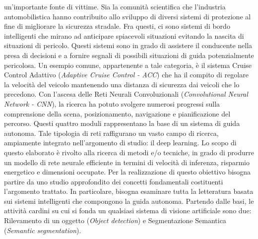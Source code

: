 un'importante fonte di vittime. Sia la comunità scientifica che l'industria automobilistica hanno contribuito allo sviluppo di diversi sistemi di protezione al fine di migliorare la sicurezza stradale.  Fra questi, ci sono sistemi di bordo intelligenti che mirano ad anticipare spiacevoli situazioni evitando la nascita di situazioni di pericolo. Questi sistemi sono in grado di assistere il conducente nella presa di decisioni e a fornire segnali di possibili situazioni di guida potenzialmente pericolosa. Un esempio comune, appartenente a tale categoria, è il sistema Cruise Control Adattivo (\emph{Adaptive Cruise Control - ACC}) che ha il compito di regolare la velocità del veicolo mantenendo una distanza di sicurezza dai veicoli che lo precedono.
Con l'ascesa delle Reti Neurali Convoluzionali (\emph{Convolutional Neural Network - CNN}), la ricerca ha potuto svolgere numerosi progressi sulla comprensione della scena, posizionamento, navigazione e pianificazione del percorso. Questi quattro moduli rappresentano la base di un sistema di guida autonoma. Tale tipologia di reti raffigurano un vasto campo di ricerca, ampiamente integrato nell'argomento di studio: il deep learning. Lo scopo di questo elaborato è rivolto alla ricerca di metodi e/o tecniche, in grado di produrre un modello di rete neurale efficiente in termini di velocità di inferenza, risparmio energetico e dimensioni occupate. Per la realizzazione di questo obiettivo bisogna partire da uno studio approfondito dei concetti fondamentali costituenti l'argomento trattato. In particolare, bisogna esaminare tutta la letteratura basata sui sistemi intelligenti che compongono la guida autonoma. Partendo dalle basi, le attività cardini su cui si fonda un qualsiasi sistema di visione artificiale sono due: Rilevamento di un oggetto (\emph{Object detection}) e Segmentazione Semantica (\emph{Semantic segmentation}).
